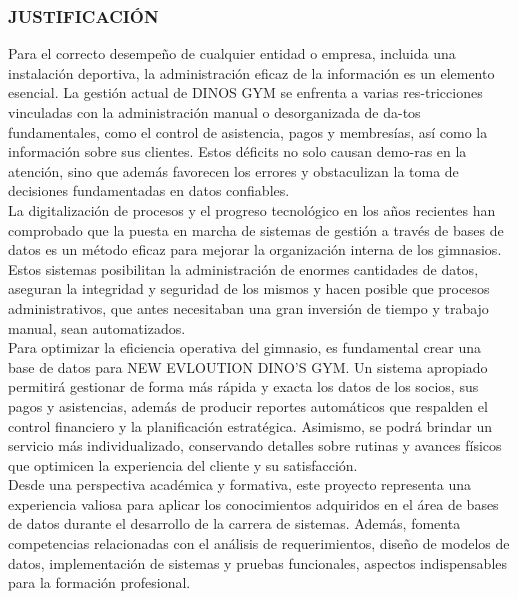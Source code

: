 \documentclass[12pt, letterpaper]{article}
\begin{document}
\subsubsection{JUSTIFICACIÓN}
Para el correcto desempeño de cualquier entidad o empresa, incluida una instalación deportiva, la administración eficaz de la información es un elemento esencial. La gestión actual de DINOS GYM se enfrenta a varias res-tricciones vinculadas con la administración manual o desorganizada de da-tos fundamentales, como el control de asistencia, pagos y membresías, así como la información sobre sus clientes. Estos déficits no solo causan demo-ras en la atención, sino que además favorecen los errores y obstaculizan la toma de decisiones fundamentadas en datos confiables.\\
La digitalización de procesos y el progreso tecnológico en los años recientes han comprobado que la puesta en marcha de sistemas de gestión a través de bases de datos es un método eficaz para mejorar la organización interna de los gimnasios. Estos sistemas posibilitan la administración de enormes cantidades de datos, aseguran la integridad y seguridad de los mismos y hacen posible que procesos administrativos, que antes necesitaban una gran inversión de tiempo y trabajo manual, sean automatizados.\\
Para optimizar la eficiencia operativa del gimnasio, es fundamental crear una base de datos para NEW EVLOUTION DINO'S GYM. Un sistema apropiado permitirá gestionar de forma más rápida y exacta los datos de los socios, sus pagos y asistencias, además de producir reportes automáticos que respalden el control financiero y la planificación estratégica. Asimismo, se podrá brindar un servicio más individualizado, conservando detalles sobre rutinas y avances físicos que optimicen la experiencia del cliente y su satisfacción.\\
Desde una perspectiva académica y formativa, este proyecto representa una experiencia valiosa para aplicar los conocimientos adquiridos en el área de bases de datos durante el desarrollo de la carrera de sistemas. Además, fomenta competencias relacionadas con el análisis de requerimientos, diseño de modelos de datos, implementación de sistemas y pruebas funcionales, aspectos indispensables para la formación profesional.
\end{document}
